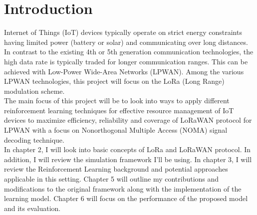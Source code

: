 \chapter{Introduction}


Internet of Things (IoT) devices typically operate on strict energy constraints having limited power (battery or solar) and communicating over long distances. In contrast to the existing 4th or 5th generation communication technologies, the high data rate is typically traded for longer communication ranges. This can be achieved with Low-Power Wide-Area Networks (LPWAN). Among the various LPWAN technologies, this project will focus on the LoRa (Long Range) modulation scheme.\\

The main focus of this project will be to look into ways to apply different reinforcement learning techniques for 
effective resource management of IoT devices to maximize efficiency, reliability and coverage of LoRaWAN protocol for LPWAN with a focus on Nonorthogonal Multiple Access (NOMA) signal decoding technique. \\

In chapter 2, I will look into basic concepts of LoRa and LoRaWAN protocol. In addition, I will review the simulation framework I'll be using. In chapter 3, I will review the Reinforcement Learning 
background and potential approaches applicable in this setting.
Chapter 5 will outline my contributions and modifications
to the original framework along with the implementation of the learning model. Chapter 6 will focus on the performance of the proposed model and its evaluation.
